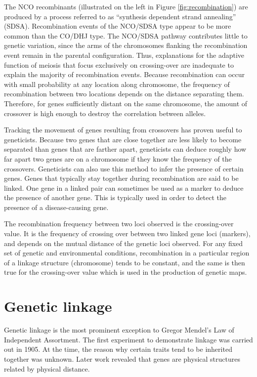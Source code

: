The NCO recombinants (illustrated on the left in Figure \ref{fig:recombination}) are produced by a process referred to as ``synthesis dependent strand annealing'' (SDSA). Recombination events of the NCO/SDSA type appear to be more common than the CO/DHJ type. The NCO/SDSA pathway contributes little to genetic variation, since the arms of the chromosomes flanking the recombination event remain in the parental configuration. Thus, explanations for the adaptive function of meiosis that focus exclusively on crossing-over are inadequate to explain the majority of recombination events.
Because recombination can occur with small probability at any location along chromosome, the frequency of recombination between two locations depends on the distance separating them. Therefore, for genes sufficiently distant on the same chromosome, the amount of crossover is high enough to destroy the correlation between alleles.

Tracking the movement of genes resulting from crossovers has proven useful to geneticists. Because two genes that are close together are less likely to become separated than genes that are farther apart, geneticists can deduce roughly how far apart two genes are on a chromosome if they know the frequency of the crossovers. Geneticists can also use this method to infer the presence of certain genes. Genes that typically stay together during recombination are said to be linked. One gene in a linked pair can sometimes be used as a marker to deduce the presence of another gene. This is typically used in order to detect the presence of a disease-causing gene.

The recombination frequency between two loci observed is the crossing-over value. It is the frequency of crossing over between two linked gene loci (markers), and depends on the mutual distance of the genetic loci observed. For any fixed set of genetic and environmental conditions, recombination in a particular region of a linkage structure (chromosome) tends to be constant, and the same is then true for the crossing-over value which is used in the production of genetic maps.

\hypertarget{genetic-linkage}{%
\section{Genetic linkage}\label{genetic-linkage}}

Genetic linkage is the most prominent exception to Gregor Mendel's Law of Independent Assortment. The first experiment to demonstrate linkage was carried out in 1905. At the time, the reason why certain traits tend to be inherited together was unknown. Later work revealed that genes are physical structures related by physical distance.

